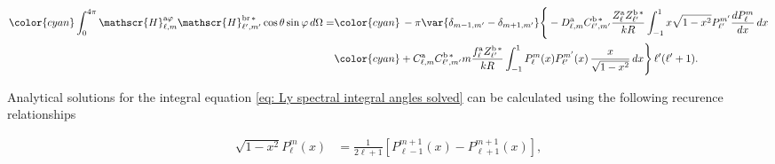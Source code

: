 \begin{align}
%
%
% 
\color{cyan}\int_0^{4\pi}\mathscr{H}_{\ell, m}^{\text{a}\varphi}\mathscr{H}_{\ell^{\prime}, m^{\prime}}^{\text{br}\,*}\cos\theta\sin\varphi \, d\Omega
%
 =& \color{cyan}\, - \pi \var{ \delta_{m-1, m^{\prime}} - \delta_{m+1, m^{\prime}} } \Bigg\{ -D_{\ell, m}^{\rm a} C_{\ell^{\prime}, m^{\prime}}^{\rm b \, *} \frac{Z_{\ell}^{\rm a} Z_{\ell^{\prime}}^{\rm b \, *}}{k R} \int_{-1}^1 x \sqrt{1-x^2} P_{\ell^{\prime}}^{m^{\prime}} \frac{dP_{\ell}^m}{dx} \,dx \nonumber \\ &
%
 \color{cyan}+ C_{\ell, m}^{\rm a} C_{\ell^{\prime}, m^{\prime}}^{\rm b \, *} m \frac{f_{\ell}^{\rm a} Z_{\ell^{\prime}}^{\rm b\, *}}{k R} \int_{-1}^1 P_{\ell}^{m}(x) P_{\ell^{\prime}}^{m^{\prime}}(x) \, \frac{x}{\sqrt{1-x^2}} \, dx \Bigg\} \, \ell^{\prime}(\ell^{\prime}+1).  
% 
%
\end{align}

Analytical solutions for the integral equation \eqref{eq: Ly spectral integral angles solved} can be calculated using the following recurence relationships

\begin{align}
\sqrt{1-x^2} P_{\ell}^{m} (x) &= \frac{1}{2\ell +1}\left[ P_{\ell-1}^{m+1}(x)-P_{\ell+1}^{m+1}(x)\right], 
\end{align}

